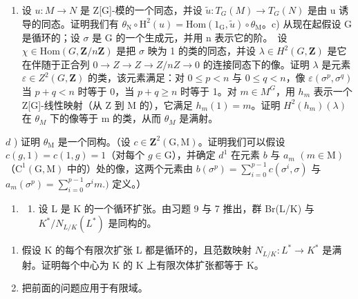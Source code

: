 \begin{enumerate}
\def\labelenumi{\alph{enumi})}
\setcounter{enumi}{1}
\tightlist
\item
  设 \(u: M \to N\) 是 Z{[}G{]}-模的一个同态，并设 \(\widetilde{u}: T_{G}(M) \to T_{G}(N)\) 是由 u 诱导的同态。证明我们有 \(\theta_{\mathrm{N}} \circ \mathrm{H}^{2}(u) = \mathrm{Hom}(1_{\mathrm{G}}, \widetilde{u}) \circ \theta_{\mathrm{M}}\)。c) 从现在起假设 G 是循环的；设 \(\sigma\) 是 G 的一个生成元，并用 n 表示它的阶。~设 \(\chi \in \mathrm{Hom}(G, \mathbf{Z}/n\mathbf{Z})\) 是把 \(\sigma\) 映为 1 的类的同态，并设 \(\lambda \in H^{2}(G, \mathbf{Z})\) 是它在伴随于正合列 \(0 \to Z \to Z \to Z/nZ \to 0\) 的连接同态下的像。证明 \(\lambda\) 是元素 \(\varepsilon \in Z^{2}(G, \mathbf{Z})\) 的类，该元素满足：对 \(0 \leqslant p < n\) 与 \(0 \leqslant q < n\)，像 \(\varepsilon(\sigma^{p}, \sigma^{q})\) 当 \(p + q < n\) 时等于 0，当 \(p + q \geqslant n\) 时等于 1。对 \(m \in M^{G}\)，用 \(h_{m}\) 表示一个 Z{[}G{]}-线性映射（从 Z 到 M 的），它满足 \(h_{m}(1) = m\)。证明 \(H^{2}(h_{m})(\lambda)\) 在 \(\theta_{M}\) 下的像等于 m 的类，从而 \(\theta_{M}\) 是满射。
\end{enumerate}

\(d\) ) 证明 \(\theta_{\mathrm{M}}\) 是一个同构。（设 \(c\in \mathbf{Z}^2 (\mathrm{G},\mathrm{M})\)。证明我们可以假设 \(c(g,1) = c(1,g) = 1\)（对每个 \(g\in \mathrm{G}\)），并确定 \(d^1\) 在元素 \(b\) 与 \(a_{m}\) \((m\in \mathrm{M})\)（\(\mathrm{C}^1 (\mathrm{G},\mathrm{M})\) 中的）处的像，这两个元素由 \(b(\sigma^{p}) = \sum_{i = 0}^{p - 1}c(\sigma^{i},\sigma)\) 与 \(a_{m}(\sigma^{p}) = \sum_{i = 0}^{p - 1}\sigma^{i}m.)\) 定义。）

\begin{enumerate}
\def\labelenumi{\arabic{enumi})}
\setcounter{enumi}{9}
\tightlist
\item
  \begin{enumerate}
  \def\labelenumii{\alph{enumii})}
  \tightlist
  \item
    设 L 是 K 的一个循环扩张。由习题 9 与 7 推出，群 Br(L/K) 与 \(K^{*}/N_{L/K}(L^{*})\) 是同构的。
  \end{enumerate}
\end{enumerate}

\begin{enumerate}
\def\labelenumi{\alph{enumi})}
\setcounter{enumi}{1}
\item
  假设 K 的每个有限次扩张 L 都是循环的，且范数映射 \(N_{L/K}: L^{*} \to K^{*}\) 是满射。证明每个中心为 K 的 K 上有限次体扩张都等于 K。
\item
  把前面的问题应用于有限域。
\end{enumerate}

